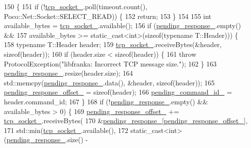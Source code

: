 \begin{DoxyCode}
150                                                                  \{
151   \textcolor{keywordflow}{if} (!\hyperlink{classfranka_1_1Network_a2c26c04f9ccb9792074799b101ee53e9}{tcp\_socket\_}.poll(timeout.count(), Poco::Net::Socket::SELECT\_READ)) \{
152     \textcolor{keywordflow}{return};
153   \}
154 
155   \textcolor{keywordtype}{int} available\_bytes = \hyperlink{classfranka_1_1Network_a2c26c04f9ccb9792074799b101ee53e9}{tcp\_socket\_}.available();
156   \textcolor{keywordflow}{if} (\hyperlink{classfranka_1_1Network_a745d141f621767ebd98662e1239ab039}{pending\_response\_}.empty() &&
157       available\_bytes >= \textcolor{keyword}{static\_cast<}\textcolor{keywordtype}{int}\textcolor{keyword}{>}(\textcolor{keyword}{sizeof}(\textcolor{keyword}{typename} T::Header))) \{
158     \textcolor{keyword}{typename} T::Header header;
159     \hyperlink{classfranka_1_1Network_a2c26c04f9ccb9792074799b101ee53e9}{tcp\_socket\_}.receiveBytes(&header, \textcolor{keyword}{sizeof}(header));
160     \textcolor{keywordflow}{if} (header.size < \textcolor{keyword}{sizeof}(header)) \{
161       \textcolor{keywordflow}{throw} ProtocolException(\textcolor{stringliteral}{"libfranka: Incorrect TCP message size."});
162     \}
163     \hyperlink{classfranka_1_1Network_a745d141f621767ebd98662e1239ab039}{pending\_response\_}.resize(header.size);
164     std::memcpy(\hyperlink{classfranka_1_1Network_a745d141f621767ebd98662e1239ab039}{pending\_response\_}.data(), &header, \textcolor{keyword}{sizeof}(header));
165     \hyperlink{classfranka_1_1Network_a6b514fb4c63a98080b346ac85f717739}{pending\_response\_offset\_} = \textcolor{keyword}{sizeof}(header);
166     \hyperlink{classfranka_1_1Network_a5164b5782401061ed04063da53c1e188}{pending\_command\_id\_} = header.command\_id;
167   \}
168   \textcolor{keywordflow}{if} (!\hyperlink{classfranka_1_1Network_a745d141f621767ebd98662e1239ab039}{pending\_response\_}.empty() && available\_bytes > 0) \{
169     \hyperlink{classfranka_1_1Network_a6b514fb4c63a98080b346ac85f717739}{pending\_response\_offset\_} += \hyperlink{classfranka_1_1Network_a2c26c04f9ccb9792074799b101ee53e9}{tcp\_socket\_}.receiveBytes(
170         &\hyperlink{classfranka_1_1Network_a745d141f621767ebd98662e1239ab039}{pending\_response\_}[\hyperlink{classfranka_1_1Network_a6b514fb4c63a98080b346ac85f717739}{pending\_response\_offset\_}],
171         std::min(\hyperlink{classfranka_1_1Network_a2c26c04f9ccb9792074799b101ee53e9}{tcp\_socket\_}.available(),
172                  \textcolor{keyword}{static\_cast<}\textcolor{keywordtype}{int}\textcolor{keyword}{>}(\hyperlink{classfranka_1_1Network_a745d141f621767ebd98662e1239ab039}{pending\_response\_}.size() - 

\end{DoxyCode}
